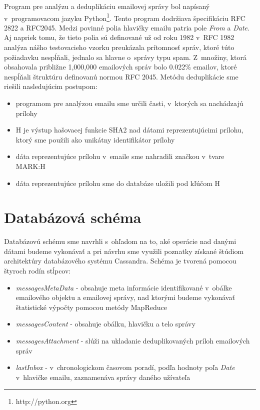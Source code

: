 \documentclass[11pt,twoside,a4paper]{book}
\begin{document}
Program pre analýzu a deduplikáciu emailovej správy bol napísaný v~programovacom jazyku Python\footnote{http://python.org}. Tento program dodržiava špecifikáciu RFC 2822 a RFC2045. 
Medzi povinné polia hlavičky emailu patria pole \emph{From} a \emph{Date}. Aj napriek tomu, že tieto polia sú definované už od roku 1982 v~RFC 1982 analýza nášho testovacieho vzorku preukázala prítomnosť správ, ktoré túto požiadavku nespĺňali, jednalo sa hlavne o~správy typu spam. Z~množiny, ktorá obsahovala približne 1,000,000 emailových správ bolo 0.022\% emailov, ktoré nespĺňali štruktúru definovanú normou RFC 2045. Metódu deduplikácie sme riešili nasledujúcim postupom:

\begin{itemize}
 \item programom pre analýzou emailu sme určili časti, v~ktorých sa nachádzajú prílohy
 \item H je výstup hašovacej funkcie SHA2 nad dátami reprezentujúcimi prílohu, ktorý sme použili ako unikátny identifikátor prílohy
 \item dáta reprezentujúce prílohu v~emaile sme nahradili značkou v~tvare MARK:H
 \item dáta reprezentujúce prílohu sme do databáze uložili pod kľúčom H
\end{itemize}


\section{Databázová schéma}

Databázovú schému sme navrhli s~ohľadom na to, aké operácie nad danými dátami budeme vykonávať a pri návrhu sme využili poznatky získané štúdiom architektúry databázového systému Cassandra. Schéma je tvorená pomocou štyroch rodín stĺpcov:

\begin{itemize}
 \item \emph{messagesMetaData} - obsahuje meta informácie identifikované v~obálke emailového objektu a emailovej správy, nad ktorými budeme vykonávať štatistické výpočty pomocou metódy MapReduce
 \item \emph{messagesContent} - obsahuje obálku, hlavičku a telo správy
 \item \emph{messagesAttachment} - slúži na ukladanie deduplikovaných príloh emailových správ  
 \item \emph{lastInbox} - v~chronologickom časovom poradí, podľa hodnoty poľa \emph{Date} v~hlavičke emailu, zaznamenáva správy daného užívateľa
\end{itemize}
\end{document}
